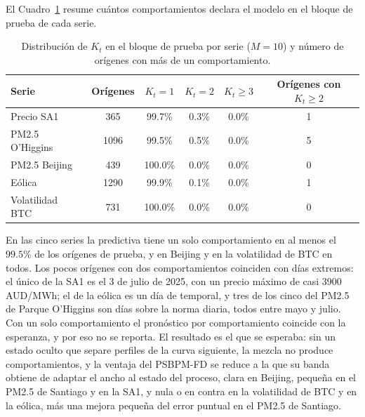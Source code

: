El Cuadro~\ref{tab:aneD_K} resume cuántos comportamientos declara el modelo en el bloque de prueba de cada serie.

\begin{table}[H]
\centering\small
\setlength{\tabcolsep}{3.5pt}
\caption{Distribución de $K_t$ en el bloque de prueba por serie ($M = 10$) y número de orígenes con más de un comportamiento.}
\label{tab:aneD_K}
\begin{tabular}{l c ccc c}
\hline
Serie & Orígenes & $K_t = 1$ & $K_t = 2$ & $K_t \ge 3$ & Orígenes con $K_t \ge 2$ \\
\hline
Precio SA1 & 365 & 99.7\% & 0.3\% & 0.0\% & 1 \\
PM2.5 O'Higgins & 1096 & 99.5\% & 0.5\% & 0.0\% & 5 \\
PM2.5 Beijing & 439 & 100.0\% & 0.0\% & 0.0\% & 0 \\
Eólica & 1290 & 99.9\% & 0.1\% & 0.0\% & 1 \\
Volatilidad BTC & 731 & 100.0\% & 0.0\% & 0.0\% & 0 \\
\hline
\end{tabular}
\end{table}

En las cinco series la predictiva tiene un solo comportamiento en al menos el $99.5\%$ de los orígenes de prueba, y en Beijing y en la volatilidad de BTC en todos. Los pocos orígenes con dos comportamientos coinciden con días extremos: el único de la SA1 es el 3 de julio de 2025, con un precio máximo de casi 3900 AUD/MWh; el de la eólica es un día de temporal, y tres de los cinco del PM2.5 de Parque O'Higgins son días sobre la norma diaria, todos entre mayo y julio. Con un solo comportamiento el pronóstico por comportamiento coincide con la esperanza, y por eso no se reporta. El resultado es el que se esperaba: sin un estado oculto que separe perfiles de la curva siguiente, la mezcla no produce comportamientos, y la ventaja del PSBPM-FD se reduce a la que su banda obtiene de adaptar el ancho al estado del proceso, clara en Beijing, pequeña en el PM2.5 de Santiago y en la SA1, y nula o en contra en la volatilidad de BTC y en la eólica, más una mejora pequeña del error puntual en el PM2.5 de Santiago.
